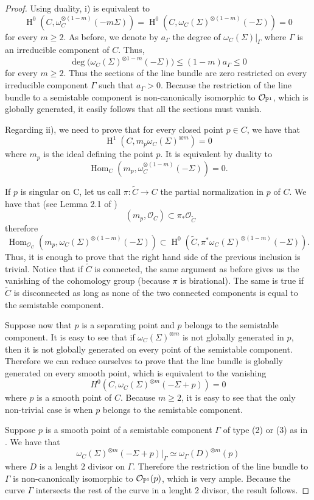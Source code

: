 \documentclass{alggeom}
\numberwithin{equation}{section}
\numberwithin{subsection}{section}
\theoremstyle{definition}
\theoremstyle{remark}
\newcommand\cO{\mathcal{O}} \newcommand\cP{\mathcal{P}}
\renewcommand\H{\operatorname{H}}
\renewcommand\hom{\operatorname{Hom}}
\newcommand{\underhom}{\mathop{\underline{\mathrm{Hom}}}\nolimits}
\begin{document}
\begin{proof}
	 Using duality, i) is equivalent to 
	$$ \H^0(C,\omega_C^{\otimes (1-m)}(-m\Sigma))=\H^0(C,\omega_C(\Sigma)^{\otimes (1-m)}(-\Sigma))=0$$
	for every $m\geq 2$. As before, we denote by $a_{\Gamma}$ the degree of $\omega_C(\Sigma)\vert_{\Gamma}$ where $\Gamma$ is an irreducible component of $C$. Thus, 
	$$\deg \big(\omega_C(\Sigma)^{\otimes 1-m}(-\Sigma)\big) \leq (1-m)a_{\Gamma}\leq 0$$
	for every $m\geq2$. Thus the sections of the line bundle are zero restricted on every irreducible component $\Gamma$ such that $a_{\Gamma}>0$. Because the restriction of the line bundle to a semistable component is non-canonically isomorphic to $\cO_{\PP^1}$, which is globally generated, it easily follows that all the sections must vanish.
	
		
	Regarding ii), we need to prove that for every closed point $p \in C$, we have that 
	$$ \H^1(C,m_p\omega_C(\Sigma)^{\otimes m})= 0$$ 
	where $m_p$ is the ideal defining the point $p$. It is equivalent by duality to 
	$$ \hom_C(m_p,\omega_C^{\otimes (1-m)}(-\Sigma))=0.$$
	
	If $p$ is singular on C, let us call $\pi:\tilde{C} \rightarrow C$ the partial normalization in $p$ of $C$. We have that (see Lemma 2.1 of \cite{Cat})
	$$ \underhom(m_{p},\cO_C) \subset \pi_{*}\cO_{\tilde{C}}$$
	therefore  
	$$\hom_{\cO_C}(m_p, \omega_C(\Sigma)^{\otimes (1-m)}(-\Sigma))\subset \H^0(\tilde{C}, \pi^*\omega_C(\Sigma)^{\otimes (1-m)}(-\Sigma)).$$
	Thus, it is enough to prove that the right hand side of the previous inclusion is trivial. Notice that if $\tilde{C}$ is connected, the same argument as before gives us the vanishing of the cohomology group (because $\pi$ is birational). The same is true if $\tilde{C}$ is disconnected as long as none of the two connected components is equal to the semistable component. 
	
	Suppose now that $p$ is a separating point and $p$ belongs to the semistable component. It is easy to see that if $\omega_C(\Sigma)^{\otimes m}$ is not globally generated in $p$, then it is not globally generated on every point of the semistable component. Therefore we can reduce ourselves to prove that the line bundle is globally generated on every smooth point, which is equivalent to the vanishing  
	$$H^0(C,\omega_C(\Sigma)^{\otimes m}(-\Sigma + p)) = 0$$
	where $p$ is a smooth point of $C$. Because $m\geq 2$, it is easy to see that the only non-trivial case is when $p$ belongs to the semistable component. 
	
	Suppose $p$ is a smooth point of a semistable component $\Gamma$ of type (2) or (3) as in . We have that 
	$$\omega_C(\Sigma)^{\otimes m}(-\Sigma+p)\vert_{\Gamma}\simeq \omega_{\Gamma}(D)^{\otimes m}(p)$$
	where $D$ is a lenght $2$ divisor on $\Gamma$. Therefore the restriction of the line bundle to $\Gamma$ is non-canonically isomorphic to $\cO_{\PP^1}(p)$, which is very ample. Because the curve $\Gamma$ intersects the rest of the curve in a lenght $2$ divisor, the result follows. 
	

\end{proof}
\end{document}
